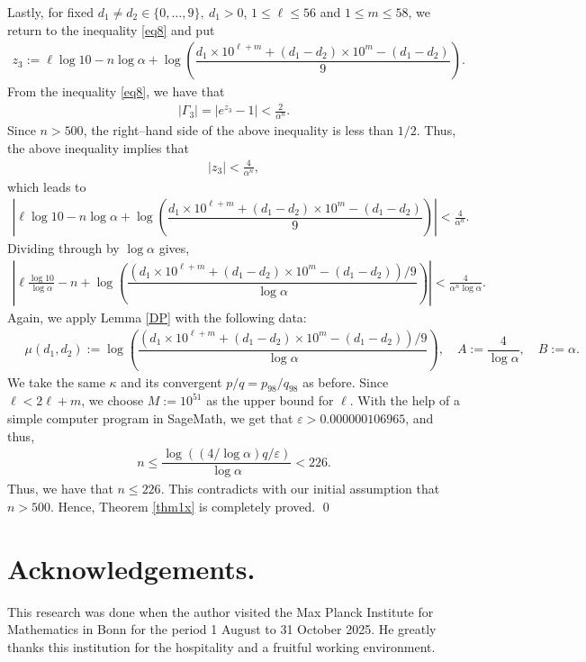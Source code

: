 \documentclass[10pt,a4paper]{article}
\begin{document}
\noindent
Lastly, for fixed $ d_1\neq d_2\in\{0, \ldots, 9\}, ~d_1>0 $, $ 1\le \ell\le 56 $ and $ 1\le m\le 58 $, we return to the inequality \eqref{eq8} and put
\begin{align*}
z_3:=\ell\log 10 -n\log\alpha +\log\left(\dfrac{d_1\times 10^{\ell+m}+(d_1-d_2)\times 10^{m}-(d_1-d_2)}{9}\right).
\end{align*}
From the inequality \eqref{eq8}, we have that
\begin{align*}
|\Gamma_3|=\left|e^{z_3}-1\right|< \frac{2}{\alpha^{n}}.
\end{align*}
Since $ n>500 $, the right--hand side of the above inequality is less than $ 1/2 $. Thus, the above inequality implies that
\begin{align*}
|z_3|<  \frac{4}{\alpha^{n}},
\end{align*}
which leads to
\begin{align*}
\left|\ell\log 10 -n\log\alpha +\log\left(\dfrac{d_1\times 10^{\ell+m}+(d_1-d_2)\times 10^{m}-(d_1-d_2)}{9}\right)\right| <  \frac{4}{\alpha^{n}}.
\end{align*}
Dividing through by $ \log\alpha $ gives,
\begin{align*}
\left|\ell\frac{\log 10}{\log\alpha} -n +\log\left(\dfrac{(d_1\times 10^{\ell+m}+(d_1-d_2)\times 10^{m}-(d_1-d_2))/9}{\log\alpha}\right)\right| <  \frac{4}{\alpha^{n}\log\alpha}.
\end{align*}
Again, we apply Lemma \ref{DP} with the following data:
\begin{align*}
 \quad \mu(d_1, d_2):=\log\left(\dfrac{(d_1\times 10^{\ell+m}+(d_1-d_2)\times 10^{m}-(d_1-d_2))/9}{\log\alpha}\right), \quad A:=\dfrac{4}{\log \alpha}, \quad B:=\alpha.
\end{align*}
We take the same $ \kappa $ and its convergent $ p/q=p_{98}/q_{98} $ as before. Since $ \ell<2\ell+m $, we choose $ M:=10^{51} $ as the upper bound for $ \ell $. With the help of a simple computer program in SageMath, we get that $ \varepsilon >0.000000106965 $, and thus,
\begin{align*}
n\le \dfrac{\log((4/\log\alpha)q/\varepsilon)}{\log\alpha}<226.
\end{align*}
Thus, we have that $ n\le 226 $. This contradicts with our initial assumption that $ n> 500 $. Hence, Theorem \ref{thm1x} is completely proved. \qed


\section*{Acknowledgements.}
This research was done when the author visited the Max Planck Institute for Mathematics in Bonn for the period 1 August to 31 October 2025. He greatly thanks this institution for the hospitality and a fruitful working environment.
\end{document}
